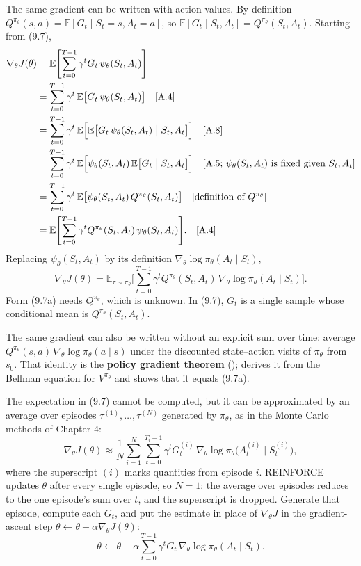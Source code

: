 The same gradient can be written with action-values. By definition $Q^{\pi_\theta}(s,a)=\mathbb{E}[G_t\mid S_t=s,A_t=a]$, so $\mathbb{E}[G_t\mid S_t,A_t]=Q^{\pi_\theta}(S_t,A_t)$. Starting from (9.7), \[
\begin{aligned}
\nabla_\theta J(\theta)
&=
\mathbb{E}\Biggl[\sum_{t=0}^{T-1}\gamma^{t}G_t\,\psi_\theta(S_t,A_t)\Biggr]
\\
&=
\sum_{t=0}^{T-1}\gamma^{t}\,\mathbb{E}\bigl[G_t\,\psi_\theta(S_t,A_t)\bigr]
\quad\text{[A.4]}
\\
&=
\sum_{t=0}^{T-1}\gamma^{t}\,\mathbb{E}\Bigl[\mathbb{E}\bigl[G_t\,\psi_\theta(S_t,A_t)\bigm|S_t,A_t\bigr]\Bigr]
\quad\text{[A.8]}
\\
&=
\sum_{t=0}^{T-1}\gamma^{t}\,\mathbb{E}\Bigl[\psi_\theta(S_t,A_t)\,\mathbb{E}\bigl[G_t\bigm|S_t,A_t\bigr]\Bigr]
\quad\text{[A.5; $\psi_\theta(S_t,A_t)$ is fixed given $S_t,A_t$]}
\\
&=
\sum_{t=0}^{T-1}\gamma^{t}\,\mathbb{E}\bigl[\psi_\theta(S_t,A_t)\,Q^{\pi_\theta}(S_t,A_t)\bigr]
\quad\text{[definition of $Q^{\pi_\theta}$]}
\\
&=
\mathbb{E}\Biggl[\sum_{t=0}^{T-1}\gamma^{t}Q^{\pi_\theta}(S_t,A_t)\,\psi_\theta(S_t,A_t)\Biggr].
\quad\text{[A.4]}
\end{aligned}
\] Replacing $\psi_\theta(S_t,A_t)$ by its definition $\nabla_\theta\log\pi_\theta(A_t\mid S_t)$, \begin{equation}
\nabla_\theta J(\theta)
=
\mathbb{E}_{\tau\sim\pi_\theta}\Biggl[
\sum_{t=0}^{T-1}
\gamma^{t}Q^{\pi_\theta}(S_t,A_t)\,\nabla_\theta\log\pi_\theta(A_t\mid S_t)
\Biggr].
\tag{9.7a}
\end{equation} Form (9.7a) needs $Q^{\pi_\theta}$, which is unknown. In (9.7), $G_t$ is a single sample whose conditional mean is $Q^{\pi_\theta}(S_t,A_t)$.

The same gradient can also be written without an explicit sum over time: average $Q^{\pi_\theta}(s,a)\,\nabla_\theta\log\pi_\theta(a\mid s)$ under the discounted state--action visits of $\pi_\theta$ from $s_0$. That identity is the \textbf{policy gradient theorem} ();  derives it from the Bellman equation for $V^{\pi_\theta}$ and shows that it equals (9.7a).

The expectation in (9.7) cannot be computed, but it can be approximated by an average over episodes $\tau^{(1)},\ldots,\tau^{(N)}$ generated by $\pi_\theta$, as in the Monte Carlo methods of Chapter 4: \[
\nabla_\theta J(\theta)
\approx
\frac{1}{N}\sum_{i=1}^{N}
\sum_{t=0}^{T_i-1}
\gamma^{t}G_t^{(i)}\,\nabla_\theta\log\pi_\theta\bigl(A_t^{(i)}\mid S_t^{(i)}\bigr),
\] where the superscript $(i)$ marks quantities from episode $i$. REINFORCE updates $\theta$ after every single episode, so $N=1$: the average over episodes reduces to the one episode's sum over $t$, and the superscript is dropped. Generate that episode, compute each $G_t$, and put the estimate in place of $\nabla_\theta J$ in the gradient-ascent step $\theta\leftarrow\theta+\alpha\nabla_\theta J(\theta)$: \begin{equation}
\theta
\leftarrow
\theta
+
\alpha
\sum_{t=0}^{T-1}
\gamma^{t}G_t\,\nabla_\theta\log\pi_\theta(A_t\mid S_t).
\tag{9.8}
\end{equation}

